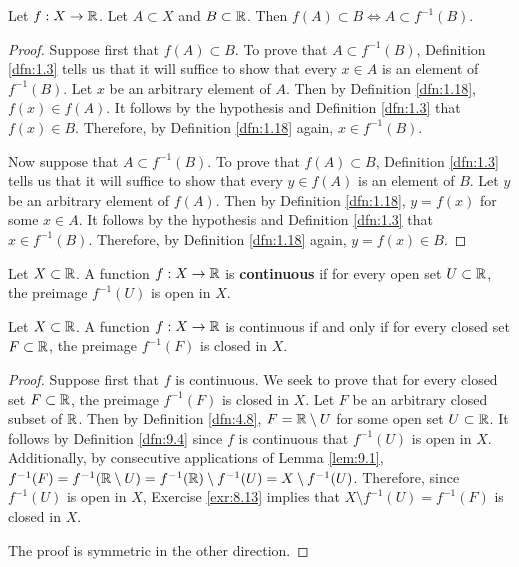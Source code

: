 \documentclass[../main.tex]{subfiles}
\begin{document}
\begin{exercise}\label{exr:9.3}
    Let $f:X\to\mathbb{R}$. Let $A\subset X$ and $B\subset\mathbb{R}$. Then $f(A)\subset B\Longleftrightarrow A\subset f^{-1}(B)$.
    \begin{proof}
        Suppose first that $f(A)\subset B$. To prove that $A\subset f^{-1}(B)$, Definition \ref{dfn:1.3} tells us that it will suffice to show that every $x\in A$ is an element of $f^{-1}(B)$. Let $x$ be an arbitrary element of $A$. Then by Definition \ref{dfn:1.18}, $f(x)\in f(A)$. It follows by the hypothesis and Definition \ref{dfn:1.3} that $f(x)\in B$. Therefore, by Definition \ref{dfn:1.18} again, $x\in f^{-1}(B)$.\par
        Now suppose that $A\subset f^{-1}(B)$. To prove that $f(A)\subset B$, Definition \ref{dfn:1.3} tells us that it will suffice to show that every $y\in f(A)$ is an element of $B$. Let $y$ be an arbitrary element of $f(A)$. Then by Definition \ref{dfn:1.18}, $y=f(x)$ for some $x\in A$. It follows by the hypothesis and Definition \ref{dfn:1.3} that $x\in f^{-1}(B)$. Therefore, by Definition \ref{dfn:1.18} again, $y=f(x)\in B$.
    \end{proof}
\end{exercise}

\begin{definition}\label{dfn:9.4}
    Let $X\subset\mathbb{R}$. A function $f:X\to\mathbb{R}$ is \textbf{continuous} if for every open set $U\subset\mathbb{R}$, the preimage $f^{-1}(U)$ is open in $X$.
\end{definition}

\begin{proposition}\label{prp:9.5}
    Let $X\subset\mathbb{R}$. A function $f:X\to\mathbb{R}$ is continuous if and only if for every closed set $F\subset\mathbb{R}$, the preimage $f^{-1}(F)$ is closed in $X$.
    \begin{proof}
        Suppose first that $f$ is continuous. We seek to prove that for every closed set $F\subset\mathbb{R}$, the preimage $f^{-1}(F)$ is closed in $X$. Let $F$ be an arbitrary closed subset of $\mathbb{R}$. Then by Definition \ref{dfn:4.8}, $F=\mathbb{R}\setminus U$ for some open set $U\subset\mathbb{R}$. It follows by Definition \ref{dfn:9.4} since $f$ is continuous that $f^{-1}(U)$ is open in $X$. Additionally, by consecutive applications of Lemma \ref{lem:9.1}, $f^{-1}(F)=f^{-1}(\mathbb{R}\setminus U)=f^{-1}(\mathbb{R})\setminus f^{-1}(U)=X\setminus f^{-1}(U)$. Therefore, since $f^{-1}(U)$ is open in $X$, Exercise \ref{exr:8.13} implies that $X\setminus f^{-1}(U)=f^{-1}(F)$ is closed in $X$.\par
        The proof is symmetric in the other direction.
    \end{proof}
\end{proposition}
\end{document}
